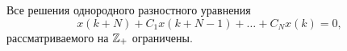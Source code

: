 \begin{comment}
 Покажем, что $ D^{-1}$ в самом деле является обратным.

   Правый обратный:
   \begin{align*}
    ( {D D}^{-1}x)(k) &= \sum_{i=0}^N C_i ( D^{-1} x)(k + N - i) = 
    \sum_{i=0}^N C_i (G * x)(k + N - i) = \sum_{i=0}^N C_i \left(\sum_{n \in \groupz} G(k+N-i-n) x(n)\right) = \\ &= \sum_{n \in \groupz} \left( \sum_{i = 0}^N C_i G(k + N - i - n) \right) x(n);
   \end{align*}
   \begin{align*}
    \sum_{i = 0}^N C_i G(k + N - i - n) &= \sum_{i=0}^N C_i \left( \int_{\groupt} (H(\gamma))^{-1} \gamma^{k + N - i - n} \dd \gamma \right) = \int_{\groupt} \sum_{i=0}^N C_i (H(\gamma))^{-1} \gamma^{k + N - i - n} \dd \gamma = \\ &= \int_{\groupt} \left(\sum_{i=0}^N \gamma^{N - i} C_i   \right) (H(\gamma))^{-1} \gamma^{k - n} \dd \gamma = \int_{\groupt} \gamma^{k-n} \dd \gamma = \delta_{nk};
   \end{align*}
   Значит,
   \[ ( {D D}^{-1}x)(k) = x(k) \]

   Левый обратный:
   \begin{align*}
    ({D}^{-1}  D x)(k) &= \sum_{n \in \groupz} G(k - n) ({D}x)(n) =
     \sum_{n \in \groupz} G(k - n) \left(\sum_{i=0}^N C_i x(n + N - i) \right) =
     \sum_{n \in \groupz} \sum_{i=0}^N  G(k - n) C_i x(n + N - i) = \\ &=
     \sum_{n \in \groupz} \sum_{i=0}^N G(k - n + N - i) C_i x(n) = \sum_{n \in \groupz}
     \left( \sum_{i=0}^N G(k + N - i - n) C_i \right) x(n) = x(k).
   \end{align*}
\end{comment}

\begin{assumption}\label{assum:bounded}
    Все решения однородного разностного уравнения
    \begin{equation}\label{eq:homogeneous}
        x(k + N) + C_1 x(k + N - 1) + \dotsc + C_N x(k) = 0,
    \end{equation}
    рассматриваемого на $\mathbb{Z}_+$ ограничены.
\end{assumption}

